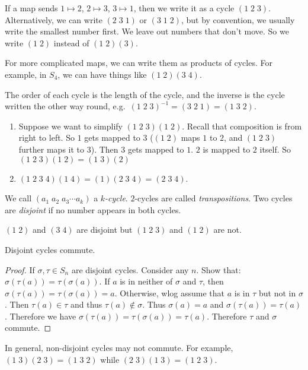 \documentclass[a4paper]{article}
\begin{document}
\begin{notation}
  If a map sends $1 \mapsto 2$, $2\mapsto 3$, $3\mapsto 1$, then we write it as a cycle $(1\;2\;3)$. Alternatively, we can write $(2\;3\;1)$ or $(3\;1\;2)$, but by convention, we usually write the smallest number first. We leave out numbers that don't move. So we write $(1\; 2)$ instead of $(1\; 2)(3)$.

  For more complicated maps, we can write them as products of cycles. For example, in $S_4$, we can have things like $(1\; 2)(3\; 4)$.
\end{notation}
The order of each cycle is the length of the cycle, and the inverse is the cycle written the other way round, e.g.\ $(1\; 2\; 3)^{-1} = (3\; 2\; 1) = (1\; 3\; 2)$.

\begin{eg}\leavevmode
  \begin{enumerate}
    \item Suppose we want to simplify $(1\; 2\; 3)(1\; 2)$. Recall that composition is from right to left. So $1$ gets mapped to $3$ ($(1\; 2)$ maps $1$ to $2$, and $(1\; 2\; 3)$ further maps it to $3$). Then $3$ gets mapped to $1$. $2$ is mapped to $2$ itself. So $(1\; 2\; 3)(1\; 2) = (1\;3)(2)$
    \item $(1\; 2\; 3\; 4)(1\; 4) = (1)(2\; 3\; 4) = (2\; 3\; 4)$.
  \end{enumerate}
\end{eg}
\begin{defi}
  We call $(a_1\; a_2\; a_3\cdots a_k)$ a \emph{$k$-cycle}. $2$-cycles are called \emph{transpositions}. Two cycles are \emph{disjoint} if no number appears in both cycles.
\end{defi}
\begin{eg}
  $(1\; 2)$ and $(3\; 4)$ are disjoint but $(1\; 2\; 3)$ and $(1\; 2)$ are not.
\end{eg}
\begin{lemma}
  Disjoint cycles commute.
\end{lemma}
\begin{proof}
  If $\sigma, \tau\in S_n$ are disjoint cycles. Consider any $n$. Show that: $\sigma(\tau(a)) = \tau(\sigma(a))$. If $a$ is in neither of $\sigma$ and $\tau$, then $\sigma(\tau(a)) = \tau(\sigma(a)) = a$. Otherwise, wlog assume that $a$ is in $\tau$ but not in $\sigma$. Then $\tau(a)\in \tau$ and thus $\tau(a)\not\in \sigma$. Thus $\sigma(a) = a$ and $\sigma(\tau(a)) = \tau(a)$. Therefore we have $\sigma(\tau(a)) = \tau(\sigma(a)) = \tau(a)$. Therefore $\tau$ and $\sigma$ commute.
\end{proof}
In general, non-disjoint cycles may not commute. For example, $(1\; 3)(2\; 3) = (1\; 3\; 2)$ while $(2\; 3)(1\; 3) = (1\; 2\; 3)$.
\end{document}
